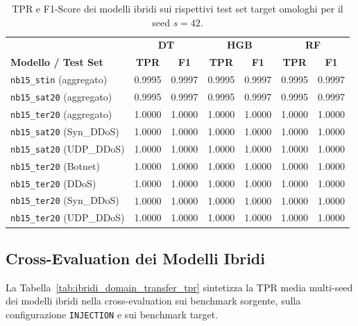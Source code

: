 \begin{table}[H]
    \centering
    \footnotesize
    \caption{TPR e F1-Score dei modelli ibridi sui rispettivi test set target omologhi per il seed $s=42$.}
    \label{tab:ibridi_matched_seed42}
    \begin{tabular}{lcc|cc|cc}
        \toprule
        & \multicolumn{2}{c|}{\textbf{DT}} & \multicolumn{2}{c|}{\textbf{HGB}} & \multicolumn{2}{c}{\textbf{RF}} \\
        \textbf{Modello / Test Set} & \textbf{TPR} & \textbf{F1} & \textbf{TPR} & \textbf{F1} & \textbf{TPR} & \textbf{F1} \\
        \midrule
        \texttt{nb15\_stin} (aggregato) & 0.9995 & 0.9997 & 0.9995 & 0.9997 & 0.9995 & 0.9997 \\
        \texttt{nb15\_sat20} (aggregato) & 0.9995 & 0.9997 & 0.9995 & 0.9997 & 0.9995 & 0.9997 \\
        \texttt{nb15\_ter20} (aggregato) & 1.0000 & 1.0000 & 1.0000 & 1.0000 & 1.0000 & 1.0000 \\
        \texttt{nb15\_sat20} (Syn\_DDoS) & 1.0000 & 1.0000 & 1.0000 & 1.0000 & 1.0000 & 1.0000 \\
        \texttt{nb15\_sat20} (UDP\_DDoS) & 1.0000 & 1.0000 & 1.0000 & 1.0000 & 1.0000 & 1.0000 \\
        \texttt{nb15\_ter20} (Botnet) & 1.0000 & 1.0000 & 1.0000 & 1.0000 & 1.0000 & 1.0000 \\
        \texttt{nb15\_ter20} (DDoS) & 1.0000 & 1.0000 & 1.0000 & 1.0000 & 1.0000 & 1.0000 \\
        \texttt{nb15\_ter20} (Syn\_DDoS) & 1.0000 & 1.0000 & 1.0000 & 1.0000 & 1.0000 & 1.0000 \\
        \texttt{nb15\_ter20} (UDP\_DDoS) & 1.0000 & 1.0000 & 1.0000 & 1.0000 & 1.0000 & 1.0000 \\
        \bottomrule
    \end{tabular}
\end{table}



\subsection{Cross-Evaluation dei Modelli Ibridi}

La Tabella~\ref{tab:ibridi_domain_transfer_tpr} sintetizza la TPR media multi-seed dei modelli ibridi nella cross-evaluation sui benchmark sorgente, sulla configurazione \texttt{INJECTION} e sui benchmark target.

